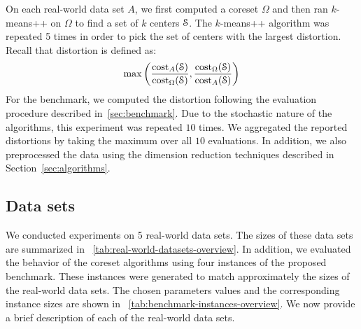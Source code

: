 On each real-world data set $A$, we first computed a coreset $\Omega$ and then ran $k$-means++ on $\Omega$ to find a set of $k$ centers $\mathcal{S}$. The $k$-means++ algorithm was repeated 5 times in order to pick the set of centers with the largest distortion. Recall that distortion is defined as:
\begin{align*}
    \max\left(
      \frac{\text{cost}_A(\mathcal{S})}{\text{cost}_{\Omega}(\mathcal{S})},
      \frac{\text{cost}_{\Omega}(\mathcal{S})}{\text{cost}_A(\mathcal{S})}
    \right)
\end{align*}
For the benchmark, we computed the distortion following the evaluation procedure described in~\cref{sec:benchmark}. Due to the stochastic nature of the algorithms, this experiment was repeated $10$ times. We aggregated the reported distortions by taking the maximum over all $10$ evaluations. In addition, we also preprocessed the data using the dimension reduction techniques described in Section~\ref{sec:algorithms}.





\subsection{Data sets}
We conducted experiments on 5 real-world data sets. 
The sizes of these data sets are summarized in ~\cref{tab:real-world-datasets-overview}. In addition, we evaluated the behavior of the coreset algorithms using four instances of the proposed benchmark. These instances were generated to match approximately the sizes of the real-world data sets. The chosen parameters values and the corresponding instance sizes are shown in ~\cref{tab:benchmark-instances-overview}. 
We now provide a brief description of each of the real-world data sets.

